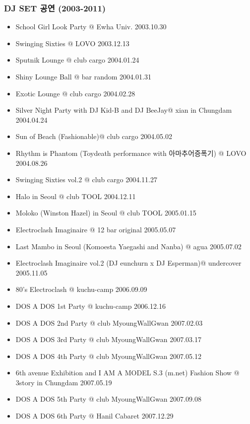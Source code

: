 \subsubsection{DJ SET 공연 (2003-2011)}
\begin{itemize}
\item School Girl Look Party @ Ewha Univ. \hfill 2003.10.30
\item Swinging Sixties @ LOVO \hfill 2003.12.13
\item Sputnik Lounge @ club cargo \hfill 2004.01.24
\item Shiny Lounge Ball @ bar random \hfill 2004.01.31
\item Exotic Lounge @ club cargo \hfill 2004.02.28
\item Silver Night Party with DJ Kid-B and DJ BeeJay@ xian in Chungdam \hfill 2004.04.24
\item Sun of Beach (Fashionable)@ club cargo \hfill 2004.05.02
\item Rhythm is Phantom (Toydeath performance with 아마추어증폭기) @ LOVO \hfill 2004.08.26
\item Swinging Sixties vol.2 @ club cargo \hfill 2004.11.27
\item Halo in Seoul @ club TOOL \hfill 2004.12.11
\item Moloko (Winston Hazel) in Seoul @ club TOOL \hfill 2005.01.15
\item Electroclash Imaginaire @ 12 bar original \hfill 2005.05.07
\item Last Mambo in Seoul (Komoesta Yaegashi and Nanba) @ agua \hfill 2005.07.02
\item Electroclash Imaginaire vol.2 (DJ eunchurn x DJ Esperman)@ undercover \hfill 2005.11.05
\item 80’s Electroclash @ kuchu-camp \hfill 2006.09.09
\item DOS A DOS 1st Party @ kuchu-camp \hfill 2006.12.16
\item DOS A DOS 2nd Party @ club MyoungWallGwan \hfill 2007.02.03
\item DOS A DOS 3rd Party @ club MyoungWallGwan \hfill 2007.03.17
\item DOS A DOS 4th Party @ club MyoungWallGwan \hfill 2007.05.12
\item 6th avenue Exhibition and I AM A MODEL S.3 (m.net) Fashion Show @ 3story in Chungdam \hfill 2007.05.19
\item DOS A DOS 5th Party @ club MyoungWallGwan \hfill 2007.09.08
\item DOS A DOS 6th Party @ Hanil Cabaret \hfill 2007.12.29

\end{itemize}

